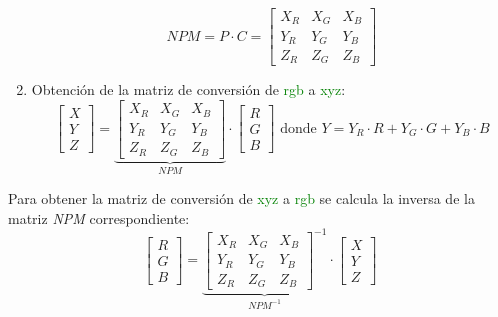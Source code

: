 \documentclass[a4paper, 12pt]{report}
\begin{document}
\begin{enumerate}
        \begin{equation}
             NPM = P\cdot C = \begin{bmatrix}
                                X_R & X_G & X_B \\
                                Y_R & Y_G & Y_B \\
                                Z_R & Z_G & Z_B
                             \end{bmatrix}
        \end{equation}
    \item Obtención de la matriz de conversión de \textcolor{green}{rgb} a \textcolor{green}{xyz}:
        \begin{equation}
             \begin{bmatrix}
                X\\
                Y\\
                Z
            \end{bmatrix}  =
            \underbrace{\begin{bmatrix}
                X_R & X_G & X_B \\
                Y_R & Y_G & Y_B \\
                Z_R & Z_G & Z_B
            \end{bmatrix}}_{NPM} \cdot 
            \begin{bmatrix}
                R\\
                G\\
                B
            \end{bmatrix}
            \textrm{ donde   }
            Y = Y_R \cdot R + Y_G \cdot G + Y_B \cdot B
        \end{equation}
        
 \end{enumerate}
 
 
 Para obtener la matriz de conversión de \textcolor{green}{xyz} a \textcolor{green}{rgb} se calcula la inversa de la matriz \textit{NPM} correspondiente:
    \begin{equation}
        \begin{bmatrix}
            R\\
            G\\
            B
        \end{bmatrix}  =
        \underbrace{\begin{bmatrix}
            X_R & X_G & X_B \\
            Y_R & Y_G & Y_B \\
            Z_R & Z_G & Z_B
        \end{bmatrix}^{-1}}_{NPM^{-1}} \cdot 
        \begin{bmatrix}
            X\\
            Y\\
            Z
        \end{bmatrix}
    \end{equation}
    
\end{document}
